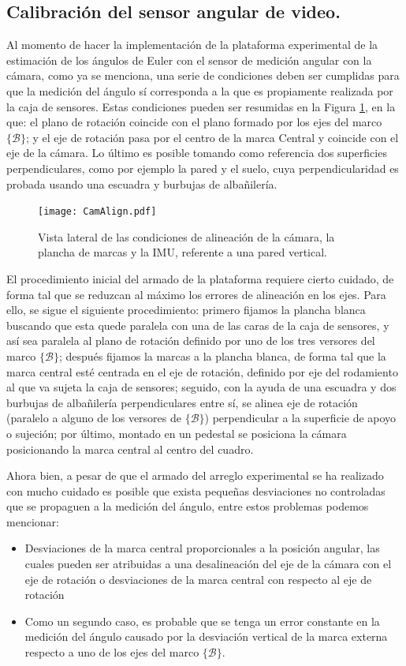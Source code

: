 \documentclass[10pt]{report}
\numberwithin{equation}{chapter}
\numberwithin{algorithm}{chapter}
\newcommand{\marco}[1]{\{\mathcal{#1}\}}
\begin{document}
\subsection{Calibración del sensor angular de video.}
Al momento de hacer la implementación de la plataforma experimental de la estimación de los ángulos de Euler con el sensor de medición angular con la cámara, como ya se menciona, una serie de condiciones deben ser cumplidas para que la medición del ángulo sí corresponda a la que es propiamente realizada por la caja de sensores. Estas condiciones pueden ser resumidas en la Figura \ref{CamAlign}, en la que: el plano de rotación coincide con el plano formado por los ejes del marco $\marco{B}$; y el eje de rotación pasa por el centro de la marca Central y coincide con el eje de la cámara. Lo último es posible tomando como referencia dos superficies perpendiculares, como por ejemplo la pared y el suelo, cuya perpendicularidad es probada usando una escuadra y burbujas de albañilería. \par
\begin{figure}[t]
\center
\texttt{[image: CamAlign.pdf]}
\caption{Vista lateral de las condiciones de alineación de la cámara, la plancha de marcas y la IMU, referente a una pared vertical.}
\label{CamAlign}
\end{figure}
El procedimiento inicial del armado de la plataforma requiere cierto cuidado, de forma tal que se reduzcan al máximo los errores de alineación en los ejes. Para ello, se sigue el siguiente procedimiento: primero fijamos la plancha blanca buscando que esta quede paralela con una de las caras de la caja de sensores, y así sea paralela al plano de rotación definido por uno de los tres versores del marco $\marco{B}$; después fijamos la marcas a la plancha blanca, de forma tal que la marca central esté centrada en el eje de rotación, definido por eje del rodamiento al que va sujeta la caja de sensores; seguido, con la ayuda de una escuadra y dos burbujas de albañilería perpendiculares entre sí, se alinea eje de rotación (paralelo a alguno de los versores de $\marco{B}$) perpendicular a la superficie de apoyo o sujeción; por último, montado en un pedestal se posiciona la cámara posicionando la marca central al centro del cuadro.\par
Ahora bien, a pesar de que el armado del arreglo experimental se ha realizado con mucho cuidado es posible que exista pequeñas desviaciones no controladas que se propaguen a la medición del ángulo, entre estos problemas podemos mencionar: 
\begin{itemize}
\item Desviaciones de la marca central proporcionales a la posición angular, las cuales pueden ser atribuidas a una desalineación del eje de la cámara con el eje de rotación o desviaciones de la marca central con respecto al eje de rotación
\item Como un segundo caso, es probable que se tenga un error constante en la medición del ángulo causado por la desviación vertical de la marca externa respecto  a uno de los ejes del marco $\marco{B}$.
\end{itemize}
\end{document}
